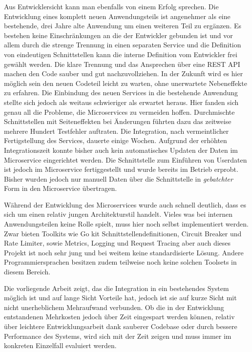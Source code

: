 Aus Entwicklersicht kann man ebenfalls von einem Erfolg sprechen. Die Entwicklung eines komplett neuen Anwendungsteils ist  angenehmer als eine bestehende, drei Jahre alte Anwendung um einen weiteren Teil zu ergänzen. Es bestehen keine Einschränkungen an die der Entwickler gebunden ist und vor allem durch die strenge Trennung in einen separaten Service und die Definition von eindeutigen Schnittstellen kann die interne Definition vom Entwickler frei gewählt werden. Die klare Trennung und das Ansprechen über eine REST API machen den Code sauber und gut nachzuvollziehen. In der Zukunft wird es hier möglich sein den neuen Codeteil leicht zu warten, ohne unerwartete Nebeneffekte zu erfahren. Die Einbindung des neuen Services in die bestehende Anwendung stellte sich jedoch als weitaus schwieriger als erwartet heraus. Hier fanden sich genau all die Probleme, die Microservices zu vermeiden hoffen. Durchmischte Schnittstellen mit Seiteneffekten bei Änderungen führten dazu das zeitweise mehrere Hundert Testfehler auftraten. Die Integration, nach vermeintlicher Fertigstellung des Services, dauerte einige Wochen.
Aufgrund der erhöhten Integrationszeit konnte bisher auch kein automatisches Updaten der Daten im Microservice eingerichtet werden. Die Schnittstelle zum Einführen von Userdaten ist jedoch im Microservice fertiggestellt und wurde bereits im Betrieb erprobt. Bisher wurden jedoch nur manuell Daten über die Schnittstelle in \textit{gebatchter} Form in den Microservice übertragen.

Während der Entwicklung des Microservices wurde auch schnell deutlich, dass es sich um einen relativ jungen Architekturstil handelt. Vieles was bei internen Anwendungsteilen keine Rolle spielt, muss hier noch selbst implementiert werden. Zwar bieten Toolkits wie Go kit \cite{gokit} Schnittstellendefinitionen, Circuit Breaker und Rate Limiter, sowie Metrics, Logging und Request Tracing aber auch dieses Projekt ist noch sehr jung und bei weitem keine standardisierte Lösung. Andere Programmiersprachen besitzen zudem teilweise noch keine solchen Toolsets in diesem Bereich.

Die vorliegende Arbeit zeigt, das die Integration in ein bestehendes System möglich ist und auf lange Sicht Vorteile hat, jedoch ist sie auf kurze Sicht mit nicht unerheblichem Mehraufwand verbunden. Ob die in der Entwicklung entstandenen Mehrkosten jedoch über Zeit eingespart werden können, relativ über leichtere Entwicklungsarbeit dank sauberer Codebase oder durch bessere Performance des Systems, wird sich mit der Zeit zeigen und muss immer im konkreten Einzelfall evaluiert werden.
